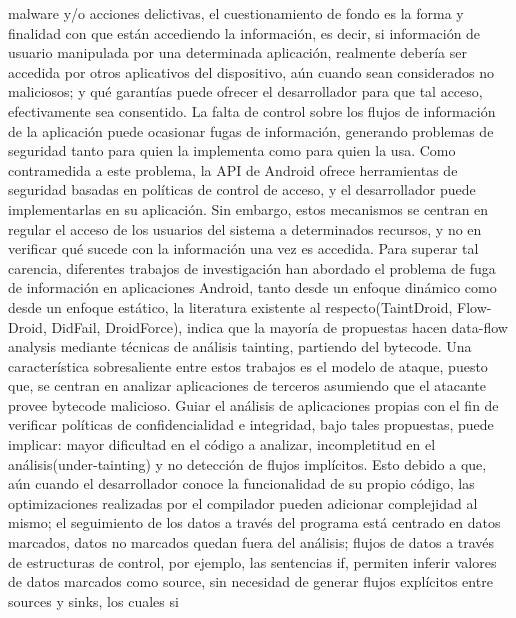 malware y/o acciones delictivas, el cuestionamiento de fondo es la forma y
finalidad con que están accediendo la información, es decir, si información
de usuario manipulada por una determinada aplicación, realmente debería ser
accedida por otros aplicativos del dispositivo, aún cuando sean considerados no
maliciosos; y qué garantías puede ofrecer el desarrollador para que tal acceso,
efectivamente sea consentido.\newline 
La falta de control sobre los flujos de información de la aplicación puede
ocasionar fugas de información, generando problemas de seguridad tanto para
quien la implementa como para quien la usa.\newline
Como contramedida a este problema, la API de Android ofrece herramientas de
seguridad basadas en políticas de control de acceso, y el desarrollador puede
implementarlas en su aplicación. Sin embargo, estos mecanismos se centran en
regular el acceso de los usuarios del sistema a determinados recursos, y no en
verificar qué sucede con la información una vez es accedida.\newline 
Para superar tal carencia, diferentes trabajos de investigación han abordado el
problema de fuga de información en aplicaciones Android, tanto desde un enfoque
dinámico como desde un enfoque estático, la literatura existente al
respecto(TaintDroid\cite{TaintDroid}, Flow-Droid\cite{FlowDroid-Thesis},
DidFail\cite{DidFail}, DroidForce\cite{DroidForce}), indica que la mayoría de
propuestas hacen data-flow analysis mediante técnicas de análisis 
tainting, partiendo del bytecode. Una característica sobresaliente entre estos
trabajos es el modelo de ataque, puesto que, se centran en analizar aplicaciones
de terceros asumiendo que el atacante provee bytecode malicioso. Guiar el
análisis de aplicaciones propias con el fin de verificar políticas de
confidencialidad e integridad, bajo tales propuestas, puede implicar: mayor
dificultad en el código a analizar, incompletitud en el análisis(under-tainting)
y no detección de flujos implícitos. Esto debido a que, aún cuando el
desarrollador conoce la funcionalidad de su propio código, las optimizaciones
realizadas por el compilador pueden adicionar complejidad al
mismo\cite[pag.~43]{SecureProgramming}; el seguimiento de los datos a través del
programa está centrado en datos marcados, datos no marcados quedan fuera del
análisis;   flujos de datos a través de estructuras de control, por ejemplo, las
sentencias if, permiten inferir valores de datos marcados como source, sin
necesidad de generar flujos explícitos entre sources y sinks, los cuales si
